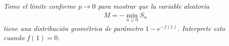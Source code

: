 \emph{
	Tome el límite conforme $p\to 0$ para mostrar que la variable aleatoria 
	\begin{align}
		M=-\min_{n\geq 0}S_n
	\end{align}
	tiene una distribuci\'on geom\'etrica de par\'ametro $1-e^{-f(1)}$. Interprete esto cuando $f(1)=0$.
}
